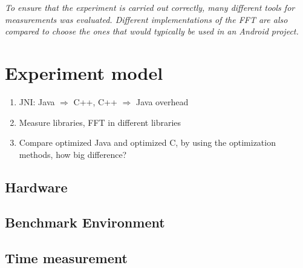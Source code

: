 \textit{To ensure that the experiment is carried out correctly, many different tools for measurements was evaluated. Different implementations of the FFT are also compared to choose the ones that would typically be used in an Android project.}

\section{Experiment model}


\begin{enumerate}
    \item JNI: Java $\Rightarrow$ C++, C++ $\Rightarrow$ Java overhead
    \item Measure libraries, FFT in different libraries
    \item Compare optimized Java and optimized C, by using the optimization methods, how big difference?
\end{enumerate}

\subsection{Hardware}

\subsection{Benchmark Environment}

\subsection{Time measurement}
